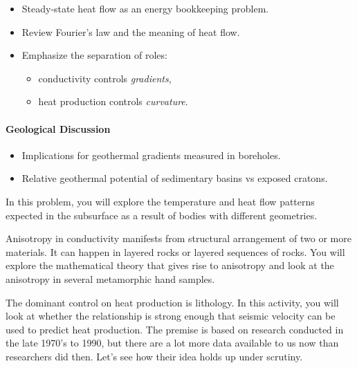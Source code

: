 \begin{itemize}
  \item Steady-state heat flow as an energy bookkeeping problem.
  \item Review Fourier's law and the meaning of heat flow.
  \item Emphasize the separation of roles:
  \begin{itemize}
    \item conductivity controls \emph{gradients},
    \item heat production controls \emph{curvature}.
  \end{itemize}
\end{itemize}

\paragraph{Geological Discussion}
\begin{itemize}
  \item Implications for geothermal gradients measured in boreholes.
  \item Relative geothermal potential of sedimentary basins vs exposed cratons.
\end{itemize}


In this problem, you will explore the temperature and heat flow patterns expected in the subsurface as a result of bodies with different geometries.


Anisotropy in conductivity manifests from structural arrangement of two or more materials.  It can happen in layered rocks or layered sequences of rocks.  You will explore the mathematical theory that gives rise to anisotropy and look at the anisotropy in several metamorphic hand samples.



The dominant control on heat production is lithology.  In this activity, you will look at whether the relationship is strong enough that seismic velocity can be used to predict heat production.  The premise is based on research conducted in the late 1970's to 1990, but there are a lot more data available to us now than researchers did then. Let's see how their idea holds up under scrutiny.

